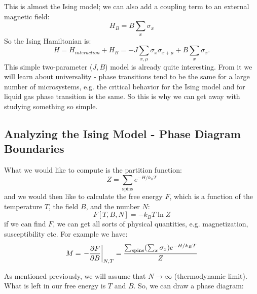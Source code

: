This is almost the Ising model; we can also add a coupling term to an external magnetic field:
\begin{equation}
    H_{B} = B\sum_x \sigma_x
\end{equation}
So the Ising Hamiltonian is:
\begin{equation}
    H = H_{interaction} + H_{B} = -J \sum_{x, \mu}\sigma_{x}\sigma_{x+\mu} +  B\sum_x \sigma_x.
\end{equation}
This simple two-parameter ($J, B$) model is already quite interesting. From it we will learn about universality - phase transitions tend to be the same for a large number of microsystems, e.g. the critical behavior for the Ising model and for liquid gas phase transition is the same. So this is why we can get away with studying something so simple.

\subsection{Analyzing the Ising Model - Phase Diagram Boundaries}
What we would like to compute is the partition function:
\begin{equation}
    Z = \sum_{\text{spins}}e^{-H/k_B T}
\end{equation}
and we would then like to calculate the free energy $F$, which is a function of the temperature $T$, the field $B$, and the number $N$:
\begin{equation}
F[T, B, N] = -k_B T \ln Z
\end{equation}
if we can find $F$, we can get all sorts of physical quantities, e.g. magnetization, susceptibility etc. For example we have:
\begin{equation}\label{eq-magnetization}
    M = \left.-\frac{\partial F}{\partial B}\right|_{N, T} = \frac{\sum_{\text{spins}}(\sum_x \sigma_x)e^{-H/k_B T}}{Z}
\end{equation}

As mentioned previously, we will assume that $N \to \infty$ (thermodynamic limit). What is left in our free energy is $T$ and $B$. So, we can draw a phase diagram:

